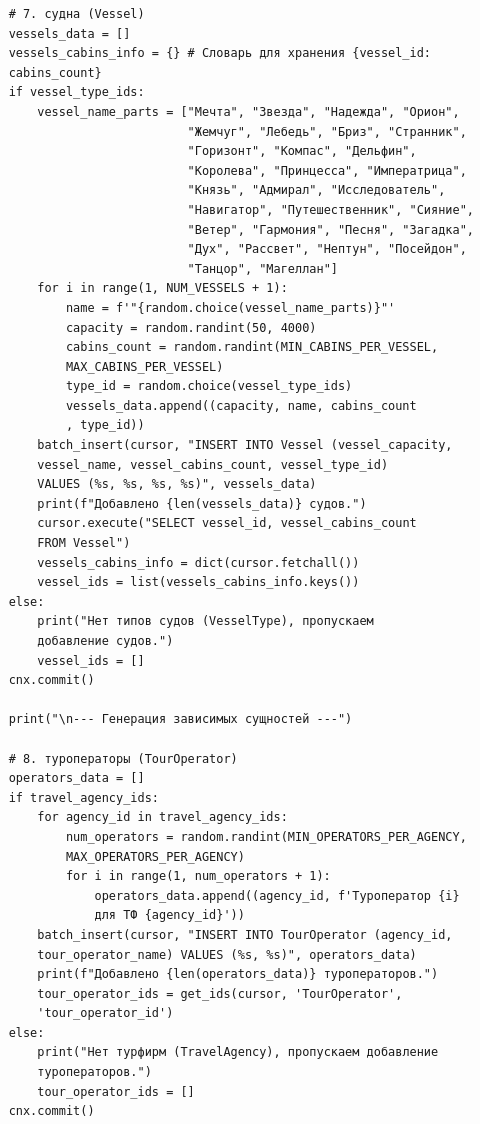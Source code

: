 \documentclass[11pt,a4paper,final]{article}
\begin{document}
{\begin{verbatim}
    # 7. судна (Vessel)
    vessels_data = []
    vessels_cabins_info = {} # Словарь для хранения {vessel_id:
    cabins_count}
    if vessel_type_ids:
        vessel_name_parts = ["Мечта", "Звезда", "Надежда", "Орион",
                             "Жемчуг", "Лебедь", "Бриз", "Странник",
                             "Горизонт", "Компас", "Дельфин", 
                             "Королева", "Принцесса", "Императрица",
                             "Князь", "Адмирал", "Исследователь",
                             "Навигатор", "Путешественник", "Сияние",
                             "Ветер", "Гармония", "Песня", "Загадка",
                             "Дух", "Рассвет", "Нептун", "Посейдон",
                             "Танцор", "Магеллан"]
        for i in range(1, NUM_VESSELS + 1):
            name = f'"{random.choice(vessel_name_parts)}"'
            capacity = random.randint(50, 4000)
            cabins_count = random.randint(MIN_CABINS_PER_VESSEL,
            MAX_CABINS_PER_VESSEL)
            type_id = random.choice(vessel_type_ids)
            vessels_data.append((capacity, name, cabins_count
            , type_id))
        batch_insert(cursor, "INSERT INTO Vessel (vessel_capacity,
        vessel_name, vessel_cabins_count, vessel_type_id)
        VALUES (%s, %s, %s, %s)", vessels_data)
        print(f"Добавлено {len(vessels_data)} судов.")
        cursor.execute("SELECT vessel_id, vessel_cabins_count 
        FROM Vessel")
        vessels_cabins_info = dict(cursor.fetchall())
        vessel_ids = list(vessels_cabins_info.keys())
    else:
        print("Нет типов судов (VesselType), пропускаем 
        добавление судов.")
        vessel_ids = []
    cnx.commit()

    print("\n--- Генерация зависимых сущностей ---")

    # 8. туроператоры (TourOperator)
    operators_data = []
    if travel_agency_ids:
        for agency_id in travel_agency_ids:
            num_operators = random.randint(MIN_OPERATORS_PER_AGENCY,
            MAX_OPERATORS_PER_AGENCY)
            for i in range(1, num_operators + 1):
                operators_data.append((agency_id, f'Туроператор {i}
                для ТФ {agency_id}'))
        batch_insert(cursor, "INSERT INTO TourOperator (agency_id,
        tour_operator_name) VALUES (%s, %s)", operators_data)
        print(f"Добавлено {len(operators_data)} туроператоров.")
        tour_operator_ids = get_ids(cursor, 'TourOperator',
        'tour_operator_id')
    else:
        print("Нет турфирм (TravelAgency), пропускаем добавление
        туроператоров.")
        tour_operator_ids = []
    cnx.commit()


\end{verbatim}}
\end{document}
